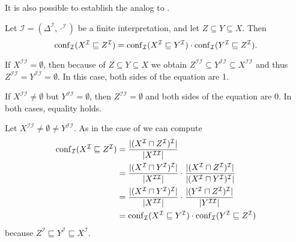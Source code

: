 It is also possible to establish the analog to .

\begin{Lemma}
  \label{lem:chain-rule-for-confidence-of-gcis}
  Let $\mathcal{I} = (\Delta^{\mathcal{I}}, \cdot^{\mathcal{I}})$ be a finite
  interpretation, and let $Z \subseteq Y \subseteq X$.  Then
  \begin{equation*}
    \operatorname{conf}_{\mathcal{I}}(X^{\mathcal{I}} \sqsubseteq Z^{\mathcal{I}}) =
    \operatorname{conf}_{\mathcal{I}}(X^{\mathcal{I}} \sqsubseteq Y^{\mathcal{I}}) \cdot
    \operatorname{conf}_{\mathcal{I}}(Y^{\mathcal{I}} \sqsubseteq Z^{\mathcal{I}}).
  \end{equation*}
\end{Lemma}
\begin{Proof}
  If $X^{\mathcal{I}\mathcal{I}} = \emptyset$, then because of $Z \subseteq Y \subseteq X$
  we obtain $Z^{\mathcal{I}\mathcal{I}} \subseteq Y^{\mathcal{I}\mathcal{I}} \subseteq
  X^{\mathcal{I}\mathcal{I}}$ and thus $Z^{\mathcal{I}\mathcal{I}} =
  Y^{\mathcal{I}\mathcal{I}} = \emptyset$.  In this case, both sides of the equation are
  1.

  If $X^{\mathcal{I}\mathcal{I}} \neq \emptyset$ but $Y^{\mathcal{I}\mathcal{I}} =
  \emptyset$, then $Z^{\mathcal{I}\mathcal{I}} = \emptyset$ and both sides of the equation
  are 0.  In both cases, equality holds.

  Let $X^{\mathcal{I}\mathcal{I}} \neq \emptyset \neq Y^{\mathcal{I}\mathcal{I}}$.  As in
  the case of  we can compute
  \begin{align*}
    \operatorname{conf}_{\mathcal{I}}(X^{\mathcal{I}} \sqsubseteq Z^{\mathcal{I}})
    &= \frac
    { \lvert (X^{\mathcal{I}} \sqcap Z^{\mathcal{I}})^{\mathcal{I}} \rvert}
    { \lvert X^{\mathcal{I}\mathcal{I}} \rvert} \\
    &= \frac
    { \lvert (X^{\mathcal{I}} \sqcap Y^{\mathcal{I}})^{\mathcal{I}} \rvert}
    { \lvert X^{\mathcal{I}\mathcal{I}} \rvert }
    \cdot \frac
    { \lvert (X^{\mathcal{I}} \sqcap Z^{\mathcal{I}})^{\mathcal{I}} \rvert}
    { \lvert (X^{\mathcal{I}} \sqcap Y^{\mathcal{I}})^{\mathcal{I}} \rvert} \\
    &= \frac
    { \lvert (X^{\mathcal{I}} \sqcap Y^{\mathcal{I}})^{\mathcal{I}} \rvert}
    { \lvert X^{\mathcal{I}\mathcal{I}} \rvert }
    \cdot \frac
    { \lvert (Y^{\mathcal{I}} \sqcap Z^{\mathcal{I}})^{\mathcal{I}} \rvert}
    { \lvert Y^{\mathcal{I}\mathcal{I}} \rvert} \\
    &= \operatorname{conf}_{\mathcal{I}}(X^{\mathcal{I}} \sqsubseteq Y^{\mathcal{I}}) \cdot
    \operatorname{conf}_{\mathcal{I}}(Y^{\mathcal{I}} \sqsubseteq Z^{\mathcal{I}})
  \end{align*}
  because $Z^{\mathcal{I}} \sqsubseteq Y^{\mathcal{I}} \sqsubseteq X^{\mathcal{I}}$.
\end{Proof}

